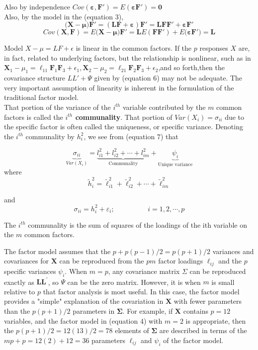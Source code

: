 \documentclass[12]{article}
\begin{document}
\noindent Also by independence $Cov(\mathbf{\varepsilon, F'})=E(\mathbf{\varepsilon F'}) =\mathbf{0}$ \\
Also, by the model in the (equation 3),
$$(\mathbf{X - \mu)F'= (LF +\varepsilon)F'=LFF' +\varepsilon F'}$$
$$Cov(\mathbf{X,F})= E(\mathbf{X-\mu)F'}= \mathbf{L}E(\mathbf{FF'}) + E(\mathbf{\varepsilon F')= L}$$

\noindent Model $X-\mu = LF + \epsilon $ is linear in the common factors. If the $p$ responses $X$ are, in fact, related to underlying factors, but the relationship is nonlinear, such as in $\mathbf{ X}_1 -\mu_1= \ell_{11}\mathbf{F}_1\mathbf{F}_3 + \epsilon_1, \mathbf{X}_2 -\mu_2= \ell_{21}\mathbf{F}_2\mathbf{F}_3 + \epsilon_2$,and so forth,then the covariance structure $LL' + \Psi $ given by (equation 6) may not be adequate. The very important assumption of linearity is inherent in the formulation of the traditional factor model. \\

\noindent That portion of the variance of the $i^{th}$ variable contributed by the $m$ common factors is called the \textbf{$i^{th}$ communality}. That portion of $Var (X_i) = \sigma_{ii}$ due to the specific factor is often called the uniqueness, or specific variance. Denoting the $i^{th}$ communality by $h_i^2$, we see from (equation 7) that

\begin{equation}
	\underbrace{\sigma_{ii}}_{Var(X_i)}= \underbrace{l_{i1}^2 + l_{i2}^2 + \cdots +l_{im}^2}_\text{Communality} +\underbrace{\psi_i}_\text{Unique variance}
\end{equation}
where
$$
\widetilde{h}_i^2=\tilde{\ell}_{i 1}^2+\tilde{\ell}_{i 2}^2+\cdots+\tilde{\ell}_{i m}^2
$$

\noindent and 
$$\sigma_{ii}= h_i^2 + \varepsilon_i ; \hspace{2cm} i= 1,2, \cdots , p$$

\noindent The $i^{th}$ communality is the sum of squares of the loadings of the ith variable on the $m$ common factors.


\noindent The factor model assumes that the $p+p(p-1) / 2=p(p+1) / 2$ variances and covariances for $\mathbf{X}$ can be reproduced from the $p m$ factor loadings $\ell_{i j}$ and the $p$ specific variances $\psi_i$. When $m=p$, any covariance matrix $\Sigma$ can be reproduced exactly as $\mathbf{L} \mathbf{L}^{\prime}$, so $\Psi$ can be the zero matrix. However, it is when $m$ is small relative to $p$ that factor analysis is most useful. In this case, the factor model provides a "simple" explanation of the covariation in $\mathbf{X}$ with fewer parameters than the $p(p+1) / 2$ parameters in $\mathbf{\Sigma}$. For example, if $\mathbf{X}$ contains $p=12$ variables, and the factor model in (equation 4) with $m=2$ is appropriate, then the $p(p+1) / 2=12(13) / 2=78$ elements of $\mathbf{\Sigma}$ are described in terms of the $m p+p=12(2)+12=36$ parameters $\ell_{i j}$ and $\psi_i$ of the factor model.\\
\end{document}
